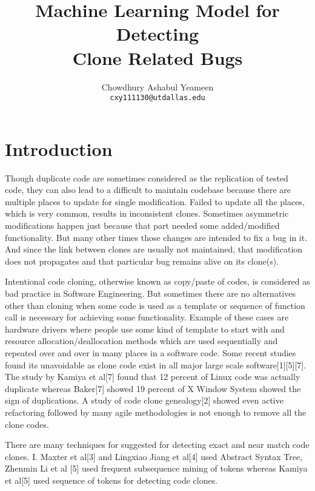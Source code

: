\documentclass[11pt]{article}
\title{Machine Learning Model for Detecting \\Clone Related Bugs}
\author{Chowdhury Ashabul Yeameen\\
\texttt{cxy111130@utdallas.edu}}
\date{}
\begin{document}
\maketitle
			
\section{Introduction}
Though duplicate code are sometimes considered as the replication of tested code, they can also lead to a difficult to maintain codebase because there are multiple places to update for single modification. Failed to update all the places, which is very common, results in inconsistent clones. Sometimes asymmetric modifications happen just because that part needed some added/modified functionality. But many other times those changes are intended to fix a bug in it. And since the link between clones are usually not maintained, that modification does not propagates and that particular bug remains alive on its clone(s).

\vspace{10 pt}
Intentional code cloning, otherwise known as copy/paste of codes, is considered as bad practice in Software Engineering. But sometimes there are no alternatives other than cloning when some code is used as a template or sequence of function call is necessary for achieving some functionality. Example of these cases are hardware drivers where people use some kind of template to start with and resource allocation/deallocation methods which are used sequentially and repeated over and over in many places in a software code. Some recent studies found its unavoidable as clone code exist in all major large scale software[1][5][7]. The study by Kamiya et al[7] found that 12 percent of Linux code was actually duplicate whereas Baker[7] showed 19 percent of X Window System showed the sign of duplications. A study of code clone genealogy[2] showed even active refactoring followed by many agile methodologies is not enough to remove all the clone codes.

\vspace{10 pt}
There are many techniques for suggested for detecting exact and near match code clones. I. Maxter et al[3] and Lingxiao Jiang et al[4] used Abstract Syntax Tree, Zhenmin Li et al [5] used frequent subsequence mining of tokens whereas Kamiya et al[5] used sequence of tokens for detecting code clones. 
\end{document}
